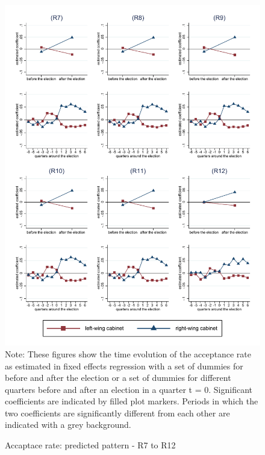 \documentclass[11pt,a4paper]{scrartcl}
\begin{document}
\clearpage
\FloatBarrier






\clearpage
\FloatBarrier


\clearpage
\FloatBarrier
\begin{figure}[!ht]
	\caption{Accaptace rate: predicted pattern - R7 to R12}
	\includegraphics[width=1\textwidth]{../results/decisions/acceptance_rate_graphs_R7-R12.pdf}
	\scriptsize{Note: These figures show the time evolution of the acceptance rate as estimated in fixed effects regression with a set of dummies for before and after the election or a set of dummies for different quarters before and after an election in a quarter t = 0. Significant coefficients are indicated by filled plot markers. Periods in which the two coefficients are significantly different from each other are indicated with a grey background.}
\end{figure}
\end{document}
